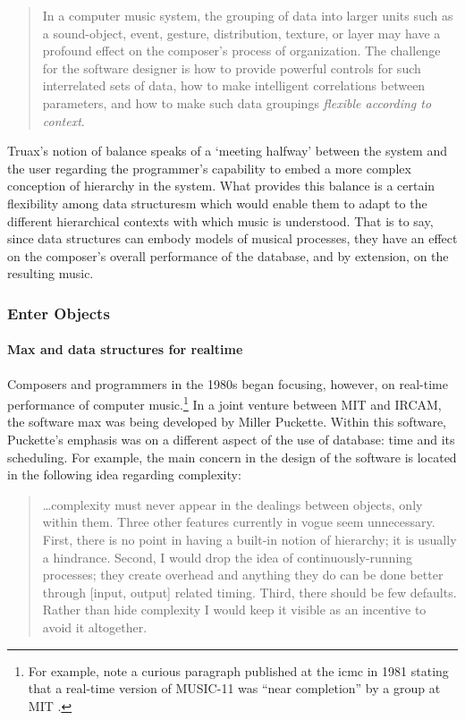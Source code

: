 	\begin{quote}
		In a computer music system, the grouping of data into larger units such as a sound-object, event, gesture, distribution, texture, or layer may have a profound effect on the composer's process of organization. The challenge for the software designer is how to provide powerful controls for such interrelated sets of data, how to make intelligent correlations between parameters, and how to make such data groupings \textit{flexible according to context}. \im \parencite[157]{Emm86:The}
	\end{quote}

	Truax's notion of balance speaks of a `meeting halfway' between the system and the user regarding the programmer's capability to embed a more complex conception of hierarchy in the system. What provides this balance is a certain flexibility among data structuresm which would enable them to adapt to the different hierarchical contexts with which music is understood. That is to say, since data structures can embody models of musical processes, they have an effect on the composer's overall performance of the database, and by extension, on the resulting music. 

\subsubsection{Enter Objects}

	\paragraph{Max and data structures for realtime}
	\label{computer:realtime}

	Composers and programmers in the 1980s began focusing, however, on real-time performance of computer music.\footnote{For example, note a curious paragraph published at the \gls{icmc} in 1981 stating that a real-time version of MUSIC-11 was ``near completion'' by a group at MIT \parencite{DBLP:conf/icmc/PucketteVS81}.} In a joint venture between MIT and IRCAM, the software \gls{max} was being developed by Miller Puckette. Within this software, Puckette's emphasis was on a different aspect of the use of database: time and its scheduling. For example, the main concern in the design of the software is located in the following idea regarding complexity:

	\begin{quote}
		\dots complexity must never appear in the dealings between objects, only within them. Three other features currently in vogue seem unnecessary. First, there is no point in having a built-in notion of hierarchy; it is usually a hindrance. Second, I would drop the idea of continuously-running processes; they create overhead and anything they do can be done better through [input, output] related timing. Third, there should be few defaults. Rather than hide complexity I would keep it visible as an incentive to avoid it altogether. \parencite[43]{DBLP:conf/icmc/Puckette86}
	\end{quote}

